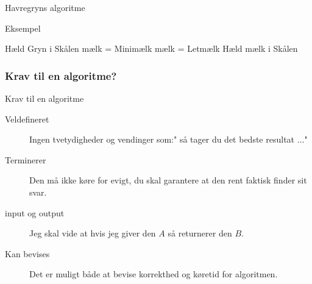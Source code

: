 \documentclass[12pt,t]{beamer}
\begin{document}
    \begin{frame}[plain]{Havregryns algoritme}
        \begin{block}{Eksempel}
        \vspace{-1.5em}
        \begin{algorithm}[H]
            \caption{\newline Indgangsbetingelser: En skål, mælk, havregryn
                     \newline Udgangsbetingelser: Morgenmad
            }
            \begin{algorithmic}
                    \State Hæld Gryn i Skålen
                \EndWhile
                    \State mælk = Minimælk
                \Else
                    \State mælk = Letmælk
                \EndIf
                    \State Hæld mælk i Skålen
                \EndWhile
            \end{algorithmic}
        \end{algorithm}
        \end{block}
    \end{frame}

    \begin{frame}
        \frametitle{Krav til en algoritme?}
        \begin{block}{Krav til en algoritme}
        \begin{description}
            \item[Veldefineret] Ingen tvetydigheder og vendinger som:"
            så tager du det bedste resultat $\dots$" \pause
            \item[Terminerer] Den må ikke køre for evigt, du skal garantere
            at den rent faktisk finder sit svar. \pause
            \item[input og output] Jeg skal vide at hvis jeg giver
            den $A$ så returnerer den $B$. \pause
            \item[Kan bevises] Det er muligt både at bevise korrekthed og
            køretid for algoritmen.
        \end{description}
        \end{block}
    \end{frame}
\end{document}
